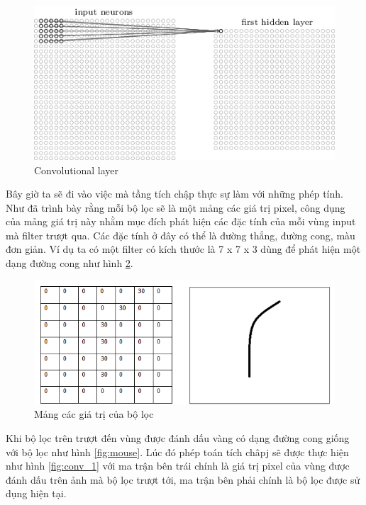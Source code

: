 		\begin{figure}[h!]
			\centering
			\includegraphics[scale=0.8]{charts/conv_layer2.png}
			\caption{Convolutional layer \cite{conv-layer}}
			\label{fig:conv_layer2}
		\end{figure}
		
		Bây giờ ta sẽ đi vào việc mà tầng tích chập thực sự làm với những phép tính. Như đã trình bày rằng mỗi bộ lọc sẽ là một mảng các giá trị pixel, công dụng của mảng giá trị này nhằm mục đích phát hiện các đặc tính của mỗi vùng input mà filter trượt qua. Các đặc tính ở đây có thể là đường thẳng, đường cong, màu đơn giản. Ví dụ ta có một filter có kích thước là 7 x 7 x 3 dùng để phát hiện một dạng đường cong như hình \ref{fig:filter}.
		
		\begin{figure}[h!]
			\centering
			\includegraphics[scale=0.5]{charts/filter.png}
			\caption{Mảng các giá trị của bộ lọc \cite{conv-layer}}
			\label{fig:filter}
		\end{figure}
		
		Khi bộ lọc trên trượt đến vùng được đánh dấu vàng có dạng đường cong giống với bộ lọc như hình \ref{fig:mouse}. Lúc đó phép toán   tích châpj sẽ được thực hiện như hình \ref{fig:conv_1} với ma trận bên trái chính là giá trị pixel của vùng được đánh dấu trên ảnh mà bộ lọc trượt tới, ma trận bên phải chính là bộ lọc được sử dụng hiện tại.
		
